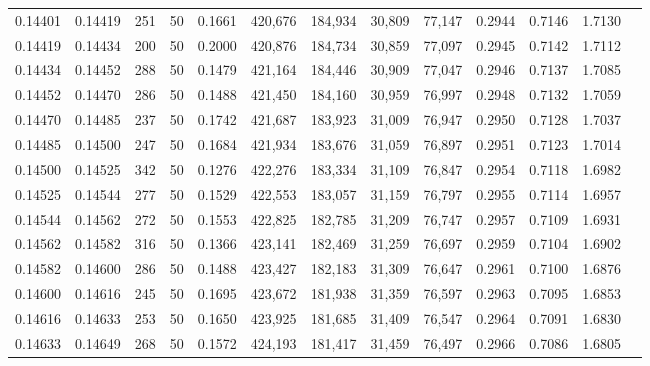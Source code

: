 \begin{tabular}{rrrrrrrrrrrrr}
0.14401 & 0.14419 &   251 &  50 &                                     0.1661 & 420,676 & 184,934 &  30,809 &  77,147 & 0.2944 & 0.7146 & 1.7130 \\
0.14419 & 0.14434 &   200 &  50 &                                     0.2000 & 420,876 & 184,734 &  30,859 &  77,097 & 0.2945 & 0.7142 & 1.7112 \\
0.14434 & 0.14452 &   288 &  50 &                                     0.1479 & 421,164 & 184,446 &  30,909 &  77,047 & 0.2946 & 0.7137 & 1.7085 \\
0.14452 & 0.14470 &   286 &  50 &                                     0.1488 & 421,450 & 184,160 &  30,959 &  76,997 & 0.2948 & 0.7132 & 1.7059 \\
0.14470 & 0.14485 &   237 &  50 &                                     0.1742 & 421,687 & 183,923 &  31,009 &  76,947 & 0.2950 & 0.7128 & 1.7037 \\
0.14485 & 0.14500 &   247 &  50 &                                     0.1684 & 421,934 & 183,676 &  31,059 &  76,897 & 0.2951 & 0.7123 & 1.7014 \\
0.14500 & 0.14525 &   342 &  50 &                                     0.1276 & 422,276 & 183,334 &  31,109 &  76,847 & 0.2954 & 0.7118 & 1.6982 \\
0.14525 & 0.14544 &   277 &  50 &                                     0.1529 & 422,553 & 183,057 &  31,159 &  76,797 & 0.2955 & 0.7114 & 1.6957 \\
0.14544 & 0.14562 &   272 &  50 &                                     0.1553 & 422,825 & 182,785 &  31,209 &  76,747 & 0.2957 & 0.7109 & 1.6931 \\
0.14562 & 0.14582 &   316 &  50 &                                     0.1366 & 423,141 & 182,469 &  31,259 &  76,697 & 0.2959 & 0.7104 & 1.6902 \\
0.14582 & 0.14600 &   286 &  50 &                                     0.1488 & 423,427 & 182,183 &  31,309 &  76,647 & 0.2961 & 0.7100 & 1.6876 \\
0.14600 & 0.14616 &   245 &  50 &                                     0.1695 & 423,672 & 181,938 &  31,359 &  76,597 & 0.2963 & 0.7095 & 1.6853 \\
0.14616 & 0.14633 &   253 &  50 &                                     0.1650 & 423,925 & 181,685 &  31,409 &  76,547 & 0.2964 & 0.7091 & 1.6830 \\
0.14633 & 0.14649 &   268 &  50 &                                     0.1572 & 424,193 & 181,417 &  31,459 &  76,497 & 0.2966 & 0.7086 & 1.6805 \\

\end{tabular}

